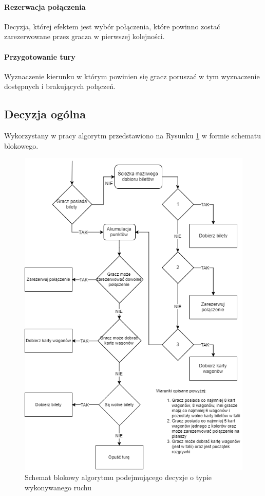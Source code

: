 \documentclass[12pt, oneside]{report}
\begin{document}
	\paragraph{Rezerwacja połączenia} Decyzja, której efektem jest wybór połączenia, które powinno zostać zarezerwowane przez gracza w pierwszej kolejności.
	\paragraph{Przygotowanie tury} Wyznaczenie kierunku w którym powinien się gracz poruszać w tym wyznaczenie dostępnych i brakujących połączeń.
	\subsection{Decyzja ogólna}
	Wykorzystany w pracy algorytm przedstawiono na Rysunku \ref{figure:alg_diagram} w formie schematu blokowego.
	\begin{figure}[h]
		\centering
		\includegraphics[height=0.6\textheight]{MainAlgorithm2.png}
		\caption{Schemat blokowy algorytmu podejmującego decyzje o typie wykonywanego ruchu}
		\label{figure:alg_diagram}
	\end{figure}
\end{document}
